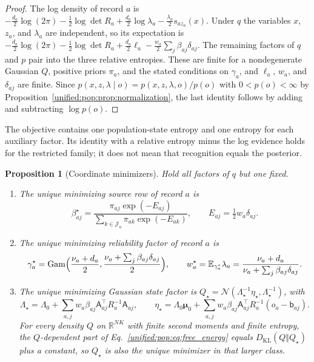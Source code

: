\documentclass[11pt]{article}
\newtheorem{proposition}[theorem]{Proposition}
\theoremstyle{definition}
\theoremstyle{remark}
\providecommand{\KL}{D_{\mathrm{KL}}}
\providecommand{\E}{\mathbb{E}}
\providecommand{\N}{\mathcal{N}}
\providecommand{\R}{\mathbb{R}}
\begin{document}
\begin{proof}
The log density of record $a$ is $-\tfrac{d_a}{2}\log(2\pi)-\tfrac12\log\det R_a+\tfrac{d_a}{2}\log\lambda_a-\tfrac{\lambda_a}{2}s_{az_a}(x)$. Under $q$ the variables $x$, $z_a$, and $\lambda_a$ are independent, so its expectation is $-\tfrac{d_a}{2}\log(2\pi)-\tfrac12\log\det R_a+\tfrac{d_a}{2}\ell_a-\tfrac{w_a}{2}\sum_j\beta_{aj}\delta_{aj}$. The remaining factors of $q$ and $p$ pair into the three relative entropies. These are finite for a nondegenerate Gaussian $Q$, positive priors $\pi_a$, and the stated conditions on $\gamma_a$, and $\ell_a$, $w_a$, and $\delta_{aj}$ are finite. Since $p(x,z,\lambda\mid o)=p(x,z,\lambda,o)/p(o)$ with $0<p(o)<\infty$ by Proposition~\ref{unified:pop:prop:normalization}, the last identity follows by adding and subtracting $\log p(o)$.
\end{proof}

The objective contains one population-state entropy and one entropy for each auxiliary factor. Its identity with a relative entropy minus the log evidence holds for the restricted family; it does not mean that recognition equals the posterior.

\begin{proposition}[Coordinate minimizers]
\label{unified:pop:prop:coordinates}
Hold all factors of $q$ but one fixed.
\begin{enumerate}
\item The unique minimizing source row of record $a$ is
\begin{equation}
\beta_{aj}^\star=\frac{\pi_{aj}\exp(-E_{aj})}{\sum_{k\in\mathcal J_a}\pi_{ak}\exp(-E_{ak})},\qquad E_{aj}=\tfrac12w_a\delta_{aj}.
\label{unified:pop:eq:row}
\end{equation}
\item The unique minimizing reliability factor of record $a$ is
\begin{equation}
\gamma_a^\star=\mathrm{Gam}\Bigl(\frac{\nu_a+d_a}{2},\frac{\nu_a+\sum_j\beta_{aj}\delta_{aj}}{2}\Bigr),\qquad w_a^\star=\E_{\gamma_a^\star}\lambda_a=\frac{\nu_a+d_a}{\nu_a+\sum_j\beta_{aj}\delta_{aj}}.
\label{unified:pop:eq:reliability}
\end{equation}
\item The unique minimizing Gaussian state factor is $Q_\star=\N(\Lambda_\star^{-1}\eta_\star,\Lambda_\star^{-1})$, with
\begin{equation}
\Lambda_\star=\Lambda_0+\sum_{a,j}w_a\beta_{aj}\mathsf A_{aj}^\top R_a^{-1}\mathsf A_{aj},\qquad
\eta_\star=\Lambda_0\boldsymbol\mu_0+\sum_{a,j}w_a\beta_{aj}\mathsf A_{aj}^\top R_a^{-1}(o_a-\mathsf b_{aj}).
\label{unified:pop:eq:state}
\end{equation}
For every density $Q$ on $\R^{NK}$ with finite second moments and finite entropy, the $Q$-dependent part of Eq.~\eqref{unified:pop:eq:free_energy} equals $\KL(Q\Vert Q_\star)$ plus a constant, so $Q_\star$ is also the unique minimizer in that larger class.
\end{enumerate}
\end{proposition}
\end{document}
